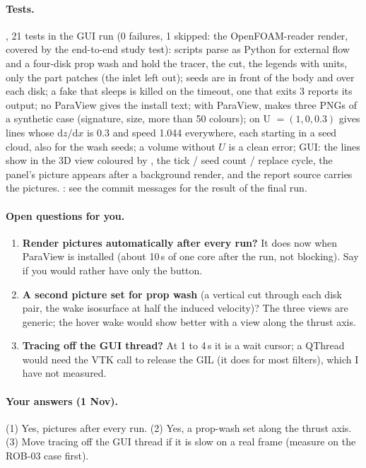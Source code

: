 \paragraph{Tests.} , 21 tests in the GUI run (0 failures, 1 skipped:
the OpenFOAM-reader render, covered by the end-to-end study test): scripts parse as Python for external flow and
a four-disk prop wash and hold the tracer, the cut, the legends with units, only the part patches (the inlet left out);
seeds are in front of the body and over each disk; a fake  that sleeps is killed on the timeout, one
that exits 3 reports its output; no ParaView gives the install text; with ParaView,  makes three PNGs
of a synthetic case (signature, size, more than 50 colours);  on U $=(1,0,0.3)$ gives lines whose
$\mathrm{d}z/\mathrm{d}x$ is 0.3 and speed 1.044 everywhere, each starting in a seed cloud, also for the wash seeds;
a volume without $U$ is a clean error; GUI: the lines show in the 3D view coloured by , the tick / seed
count / replace cycle, the panel's picture appears after a background render, and the report source carries the
pictures. : see the commit messages for the result of the final run.

\paragraph{Open questions for you.}
\begin{enumerate}[nosep]
  \item \textbf{Render pictures automatically after every run?} It does now when ParaView is installed (about 10\,s of
        one core after the run, not blocking). Say if you would rather have only the button.
  \item \textbf{A second picture set for prop wash} (a vertical cut through each disk pair, the wake isosurface at half
        the induced velocity)? The three views are generic; the hover wake would show better with a view along the thrust
        axis.
  \item \textbf{Tracing off the GUI thread?} At 1 to 4\,s it is a wait cursor; a QThread would need the VTK call to
        release the GIL (it does for most filters), which I have not measured.
\end{enumerate}

\paragraph{Your answers (1 Nov).} (1) Yes, pictures after every run. (2) Yes, a prop-wash set along the thrust axis.
(3) Move tracing off the GUI thread if it is slow on a real frame (measure on the ROB-03 case first).


